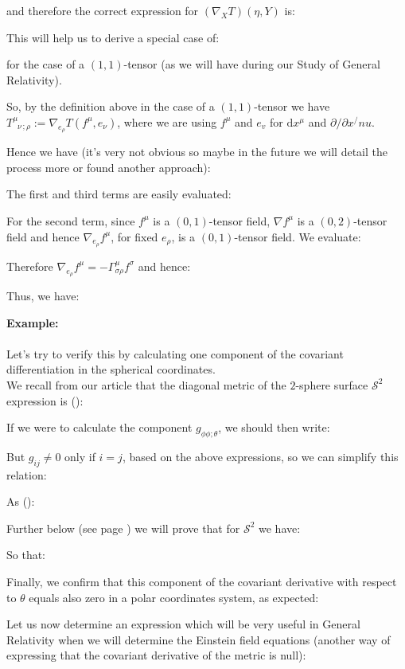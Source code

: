 	and therefore the correct expression for $(\nabla_X T)(\eta,Y)$ is:
	
	This will help us to derive a special case of:
	
	for the case of a $(1,1)$-tensor (as we will have during our Study of General Relativity).

	So, by the definition above in the case of a $(1,1)$-tensor we have $T^{\mu}_{\phantom{\mu}\nu\,;\rho}:=\nabla_{e_\rho}T(f^\mu,e_\nu)$, where we are using $f^\mu$ and $e_v$ for $\mathrm{d}x^\mu$ and $\partial/\partial x^/nu$.

	Hence we have (it's very not obvious so maybe in the future we will detail the process more or found another approach):
	
	The first and third terms are easily evaluated:
	
	For the second term, since $f^\mu$ is a $(0,1)$-tensor field, $\nabla f^\mu$ is a $(0,2)$-tensor field and hence $\nabla_{e_\rho}f^\mu$, for fixed $e_\rho$, is a $(0,1)$-tensor field. We evaluate:
	
	Therefore $\nabla_{e_\rho}f^\mu =  -\Gamma_{\sigma\rho}^\mu f^\sigma$ and hence:
	
	Thus, we have:
	
	
	\begin{tcolorbox}[colframe=black,colback=white,sharp corners]
	\textbf{{\Large {}}Example:}\\\\
	Let's try to verify this by calculating one component of the covariant differentiation in the spherical coordinates.\\
	
	We recall from our article that the diagonal metric of the $2$-sphere surface $\mathcal{S}^2$ expression is ():
	
	If we were to calculate the component $g_{\phi\phi;\theta}$, we should then write:
	
	But $g_{ij}\neq 0$ only if $i=j$, based on the above expressions, so we can simplify this relation:
	
	As ():
	
	 Further below (see page \pageref{Christoffel symbol 2-sphere}) we will prove that for $\mathcal{S}^2$ we have:
	
	So that:
	
	Finally, we confirm that this component of the covariant derivative with respect to $\theta$ equals also zero in a polar coordinates system, as expected:
	
	\end{tcolorbox}
	Let us now determine an expression which will be very useful in General Relativity when we will determine the Einstein field equations (another way of expressing that the covariant derivative of the metric is null):

